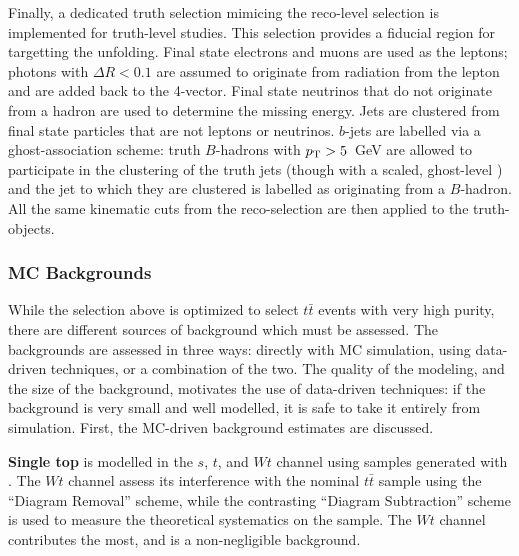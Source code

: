 
Finally, a dedicated truth selection mimicing the reco-level selection is implemented for truth-level studies. This selection provides a fiducial region for targetting the unfolding. Final state electrons and muons are used as the leptons; photons with $\Delta R < 0.1$ are assumed to originate from radiation from the lepton and are added back to the 4-vector. Final state neutrinos that do not originate from a hadron are used to determine the missing energy. Jets are clustered from final state particles that are not leptons or neutrinos. $b$-jets are labelled via a ghost-association scheme: truth $B$-hadrons with $p_{\text{T}} > 5$~GeV are allowed to participate in the clustering of the truth jets (though with a scaled, ghost-level \pt) and the jet to which they are clustered is labelled as originating from a $B$-hadron. All the same kinematic cuts from the reco-selection are then applied to the truth-objects.

\subsubsection{MC Backgrounds}

While the selection above is optimized to select $t\bar{t}$ events with very high purity, there are  different sources of background which must be assessed. The backgrounds are assessed in three ways: directly with MC simulation, using data-driven techniques, or a combination of the two. The quality of the modeling, and the size of the background, motivates the use of data-driven techniques: if the background is very small and well modelled, it is safe to take it entirely from simulation. First, the MC-driven background estimates are discussed. 

\textbf{Single top} is modelled in the $s$, $t$, and $Wt$ channel using samples generated with \PowPythia. The $Wt$ channel assess its interference with the nominal $t\bar{t}$ sample using the ``Diagram Removal'' scheme, while the contrasting ``Diagram Subtraction'' scheme is used to measure the theoretical systematics on the sample. The $Wt$ channel contributes the most, and is a non-negligible background.

